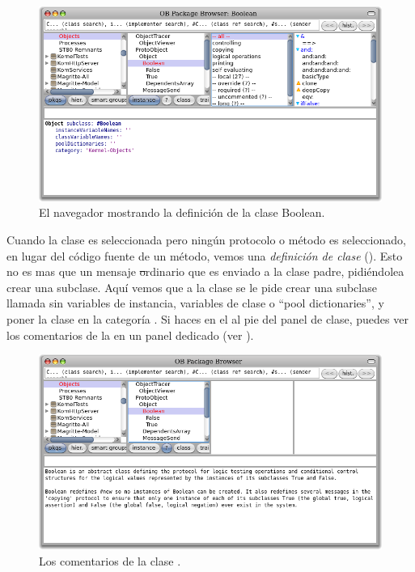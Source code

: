 \documentclass[a4paper,10pt,twoside]{book}
\begin{document}

\begin{figure}[hbt]
\centerline {\includegraphics[width=\textwidth]{Kernel-objects-boolean}}
\caption{El navegador mostrando la definici\'on de la clase Boolean.
}
\end{figure}

Cuando la clase  es seleccionada pero ning\'un protocolo o m\'etodo es seleccionado, en lugar del c\'odigo fuente de un m\'etodo, vemos una \emph{definici\'on de clase} ().
Esto no es mas que un mensaje \st ordinario que es enviado a la clase padre, pidi\'endolea crear una subclase.
Aqu\'i vemos que a la clase  se le pide crear una subclase llamada  sin variables de instancia, variables de clase o ``pool dictionaries'', y poner la clase  en la categor\'ia .
Si haces \click en el  al pie del panel de clase, puedes ver los comentarios de la  en un panel dedicado (ver ).

\begin{figure}[hbt]
\centerline {\includegraphics[width=\textwidth]{classComment}}
\caption{Los comentarios de la clase .
}
\end{figure}
\end{document}
